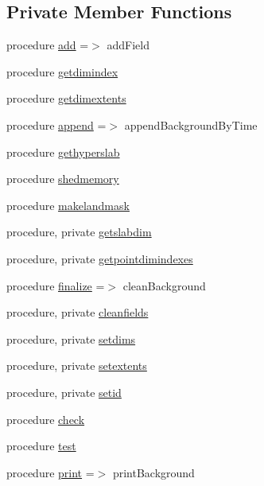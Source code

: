 \subsection*{Private Member Functions}
\begin{DoxyCompactItemize}
\item 
procedure \mbox{\hyperlink{structbackground__mod_1_1background__class_adbf91df5efe766dead76d836cb0663c4}{add}} =$>$ add\+Field
\item 
procedure \mbox{\hyperlink{structbackground__mod_1_1background__class_a91992b0ccc0956daecda2f250ba934d6}{getdimindex}}
\item 
procedure \mbox{\hyperlink{structbackground__mod_1_1background__class_adecdce1f527c3ccb5f57d8b267023f4f}{getdimextents}}
\item 
procedure \mbox{\hyperlink{structbackground__mod_1_1background__class_a2d01f214966eea8a261c03a39d36743a}{append}} =$>$ append\+Background\+By\+Time
\item 
procedure \mbox{\hyperlink{structbackground__mod_1_1background__class_acb4a97a67f51e509fade50ed4b085f07}{gethyperslab}}
\item 
procedure \mbox{\hyperlink{structbackground__mod_1_1background__class_adbeedbb2d82107fe8dca02b72ffadcec}{shedmemory}}
\item 
procedure \mbox{\hyperlink{structbackground__mod_1_1background__class_a1995f020f28b9800b39a265dfce1f868}{makelandmask}}
\item 
procedure, private \mbox{\hyperlink{structbackground__mod_1_1background__class_ac7e39271ba1838a3f1548f10ff658de1}{getslabdim}}
\item 
procedure, private \mbox{\hyperlink{structbackground__mod_1_1background__class_a12daf122cea65ebd459e8507ae2389fa}{getpointdimindexes}}
\item 
procedure \mbox{\hyperlink{structbackground__mod_1_1background__class_aa41872e2623f1fb7da1fd4b930e6b100}{finalize}} =$>$ clean\+Background
\item 
procedure, private \mbox{\hyperlink{structbackground__mod_1_1background__class_ae4dfe47f7233a9755631095933ed6276}{cleanfields}}
\item 
procedure, private \mbox{\hyperlink{structbackground__mod_1_1background__class_a5a4418427175db3e0d549fc328369993}{setdims}}
\item 
procedure, private \mbox{\hyperlink{structbackground__mod_1_1background__class_a2265e90a0a0685465a17721576919af5}{setextents}}
\item 
procedure, private \mbox{\hyperlink{structbackground__mod_1_1background__class_aa9fde21edbd805c17a6610d9db2ef4a4}{setid}}
\item 
procedure \mbox{\hyperlink{structbackground__mod_1_1background__class_ac6df939097034b1b810ab1e4dca9857a}{check}}
\item 
procedure \mbox{\hyperlink{structbackground__mod_1_1background__class_abe7c9e689ba522cbd15754980ef1cc47}{test}}
\item 
procedure \mbox{\hyperlink{structbackground__mod_1_1background__class_aa1c611fb6813d423cba8f53bdf25465d}{print}} =$>$ print\+Background
\end{DoxyCompactItemize}
